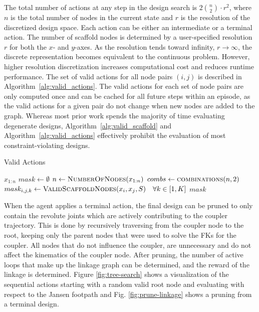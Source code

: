 The total number of actions at any step in the design search is \( 2 {n\choose{2}}\cdot r^2 \), where \( n \) is the total number of nodes in the current state and \( r \) is the resolution of the discretized design space. Each action can be either an intermediate or a terminal action. The number of scaffold nodes is determined by a user-specified resolution \( r \) for both the \( x \)- and \( y \)-axes. As the resolution tends toward infinity, \( r \rightarrow \infty \), the discrete representation becomes equivalent to the continuous problem. However, higher resolution discretization increases computational cost and reduces runtime performance. The set of valid actions for all node pairs \( (i, j) \) is described in Algorithm~\ref{alg:valid_actions}. The valid actions for each set of node pairs are only computed once and can be cached for all future steps within an episode, as the valid actions for a given pair do not change when new nodes are added to the graph. Whereas most prior work spends the majority of time evaluating degenerate designs, Algorithm~\ref{alg:valid_scaffold} and Algorithm~\ref{alg:valid_actions} effectively prohibit the evaluation of most constraint-violating designs.

\begin{algorithm}[H]
\caption{Valid Actions}
\label{alg:valid_actions}
\begin{algorithmic}[1]
\Require $x_{1:n}$ 
\State $mask \gets \emptyset$ 
\State $n \gets \textsc{NumberOfNodes}(x_{1:n})$ 
\State $combs \gets \textsc{combinations}(n, 2)$ 
    \State $mask_{i,j,k} \gets \textsc{ValidScaffoldNodes}(x_i, x_j, S) \quad \forall k \in [1, K]$ 
\EndFor
\State \Return $mask$
\end{algorithmic}
\end{algorithm}

When the agent applies a terminal action, the final design can be pruned to only contain the revolute joints which are actively contributing to the coupler trajectory. This is done by recursively traversing from the coupler node to the root, keeping only the parent nodes that were used to solve the FKs for the coupler. All nodes that do not influence the coupler, are unnecessary and do not affect the kinematics of the coupler node. After pruning, the number of active loops that make up the linkage graph can be determined, and the reward of the linkage is determined. Figure \ref{fig:tree-search} shows a visualization of the sequential actions starting with a random valid root node and evaluating with respect to the Jansen footpath and Fig. \ref{fig:prune-linkage} shows a pruning from a terminal design.

